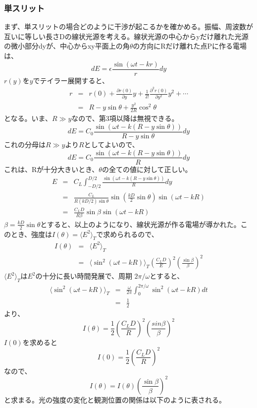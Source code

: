 \documentclass[10pt,a4j]{jarticle}
\begin{document}
\subsubsection{単スリット}
まず、単スリットの場合どのように干渉が起こるかを確かめる。振幅、周波数が互いに等しい長さDの線状光源を考える。線状光源の中心からyだけ離れた光源の微小部分dyが、中心からxy平面上の角$\theta$の方向にRだけ離れた点Pに作る電場は、
\[
dE = \epsilon \frac{\sin(\omega t - kr)}{r} dy
\]
$r(y)$を$y$でテイラー展開すると、
\begin{eqnarray*}
r &=&r(0) + \frac{\partial r(0)}{\partial y} y + \frac{1}{2!} \frac{\partial^2 r(0)}{\partial y^2} y^2 + \cdots \\
&=&R - y\sin\theta + \frac{y^2}{2R} \cos^2 \theta
\end{eqnarray*}
となる。いま、$R \gg y$なので、第3項以降は無視できる。
\[
dE = C_0 \frac{\sin(\omega t -k(R- y\sin \theta ))}{R- y \sin\theta} dy
\]
これの分母は$R \gg y$より$R$としてよいので、
\[
dE = C_0 \frac{\sin(\omega t -k(R- y\sin \theta ))}{R} dy
\]
これは、Rが十分大きいとき、$\theta$の全ての値に対して正しい。
\begin{eqnarray*}
E &=& C_L \int_{-D/2}^{D/2} \frac{\sin(\omega t - k( R - y\sin\theta ))}{R} dy \\
&=& \frac{C_L}{R(kD/2)\sin\theta} \sin\left(\frac{kD}{2} \sin \theta \right) \sin(\omega t -kR) \\
&=& \frac{C_L D}{R\beta} \sin \beta \sin(\omega t - kR)
\end{eqnarray*}
$\beta = \frac{kD}{2} \sin\theta$とすると、以上のようになり、線状光源が作る電場が導かれた。このとき、強度は$I(\theta) = \langle E^2\rangle_T$で求められるので、
\begin{eqnarray*}
I(\theta) &=& \langle E^2 \rangle_T\\
&=& \langle \sin^2(\omega t - kR)\rangle_T \left(\frac{C_L D}{E}\right)^2 \left(\frac{\sin\beta}{\beta}\right)^2
\end{eqnarray*}
$\langle E^2\rangle_T$は$E^2$の十分に長い時間発展で、周期 $2\pi / \omega$とすると、
\begin{eqnarray*}
 \langle \sin^2(\omega t - kR)\rangle_T  &=& \frac{\omega}{2\pi} \int_{0}^{2\pi / \omega} \sin^2(\omega t - kR) dt \\
 &=& \frac{1}{2} 
 \end{eqnarray*}
 より、
\[
I(\theta) = \frac{1}{2} \left(\frac{C_L D}{R}\right)^2 \left(\frac{sin \beta}{\beta}\right)^2
\]
$I(0)$を求めると
\[
I(0) = \frac{1}{2} \left(\frac{C_L D}{R}\right)^2
\]
なので、
\[
I(\theta) = I(\theta) \left(\frac{\sin \beta}{\beta}\right)^2
\]
と求まる。光の強度の変化と観測位置の関係は以下のように表される。\\
\end{document}

